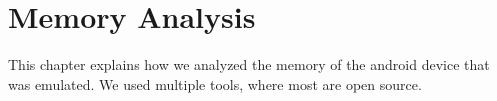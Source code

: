 \section{Memory Analysis}
This chapter explains how we analyzed the memory of the android device that was emulated. We used multiple tools, where most are open source.

